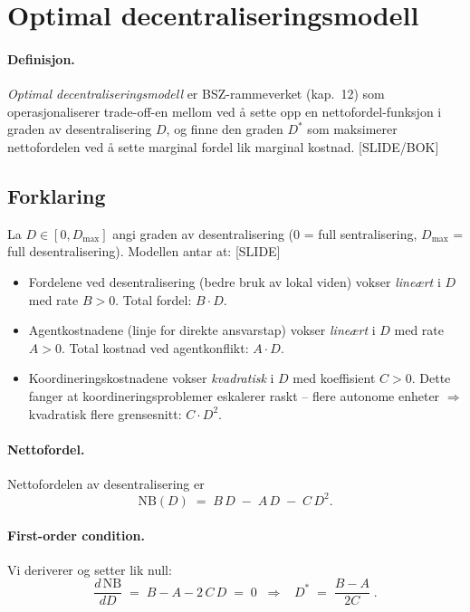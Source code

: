 \section{Optimal decentraliseringsmodell}\label{thr:optimal-decentralization-model}

\paragraph{Definisjon.} \emph{Optimal decentraliseringsmodell} er BSZ-rammeverket (kap.\ 12) som operasjonaliserer trade-off-en mellom  ved å sette opp en nettofordel-funksjon i graden av desentralisering $D$, og finne den graden $D^*$ som maksimerer nettofordelen ved å sette marginal fordel lik marginal kostnad. [SLIDE/BOK]

\subsection*{Forklaring}

La $D \in [0, D_{\max}]$ angi graden av desentralisering (0 = full sentralisering, $D_{\max}$ = full desentralisering). Modellen antar at: [SLIDE]
\begin{itemize}\setlength{\itemsep}{2pt}
\item Fordelene ved desentralisering (bedre bruk av lokal viden) vokser \emph{lineært} i $D$ med rate $B > 0$. Total fordel: $B \cdot D$.
\item Agentkostnadene (linje for direkte ansvarstap) vokser \emph{lineært} i $D$ med rate $A > 0$. Total kostnad ved agentkonflikt: $A \cdot D$.
\item Koordineringskostnadene vokser \emph{kvadratisk} i $D$ med koeffisient $C > 0$. Dette fanger at koordineringsproblemer eskalerer raskt -- flere autonome enheter $\Rightarrow$ kvadratisk flere grensesnitt: $C \cdot D^2$.
\end{itemize}

\paragraph{Nettofordel.} Nettofordelen av desentralisering er
\[
\mathrm{NB}(D) \;=\; B\,D \;-\; A\,D \;-\; C\,D^{2}.
\]

\paragraph{First-order condition.} Vi deriverer og setter lik null:
\[
\frac{d\,\mathrm{NB}}{dD} \;=\; B - A - 2\,C\,D \;=\; 0 \;\;\Longrightarrow\;\; \boxed{\;D^{*} \;=\; \frac{B-A}{2C}\;}.
\]

